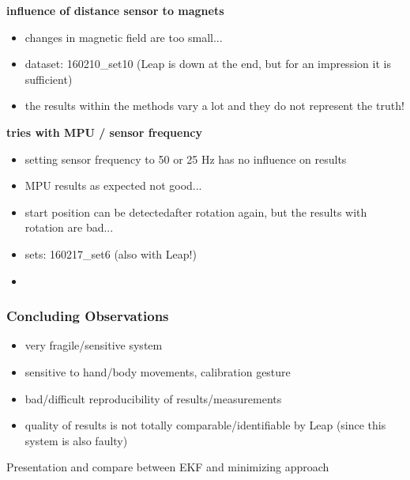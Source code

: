 \textbf{influence of distance sensor to magnets}
	\begin{itemize}
	\item changes in magnetic field are too small...
	\item dataset: 160210\_set10 (Leap is down at the end, but for an impression it is sufficient)
	\item the results within the methods vary a lot and they do not represent the truth!
	\end{itemize}

%
\textbf{tries with MPU / sensor frequency}
	\begin{itemize}
	\item setting sensor frequency to 50 or 25 Hz has no influence on results
	\item MPU results as expected not good...
	\item start position can be \grqq detected\grqq after rotation again, but the results with rotation are bad...
	\item sets: 160217\_set6 (also with Leap!)
	\item {}
	\end{itemize}

%



\subsubsection{Concluding Observations}
	\begin{itemize}
	\item very fragile/sensitive system
	\item sensitive to hand/body movements, calibration gesture
	\item bad/difficult reproducibility of results/measurements
	\item quality of results is not totally comparable/identifiable by Leap (since this system is also faulty)
	\end{itemize}


Presentation and compare between EKF and minimizing approach
